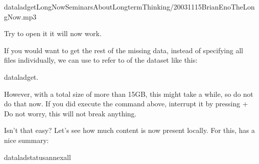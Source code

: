 \begin{sphinxVerbatim}[commandchars=\\\{\}]
dataladgetLong\PYGZus{}Now\PYGZus{}\PYGZus{}Seminars\PYGZus{}About\PYGZus{}Long\PYGZus{}term\PYGZus{}Thinking/2003\PYGZus{}11\PYGZus{}15\PYGZus{}\PYGZus{}Brian\PYGZus{}Eno\PYGZus{}\PYGZus{}The\PYGZus{}Long\PYGZus{}Now.mp3
\end{sphinxVerbatim}

\sphinxAtStartPar
Try to open it \textendash{} it will now work.

\sphinxAtStartPar
If you would want to get the rest of the missing data, instead of specifying all files individually,
we can use  to refer to  of the dataset like this:

\begin{sphinxVerbatim}[commandchars=\\\{\}]
dataladget.
\end{sphinxVerbatim}

\sphinxAtStartPar
However, with a total size of more than 15GB, this might take a while, so do not do that now.
If you did execute the command above, interrupt it by pressing  +  \textendash{} Do not worry,
this will not break anything.

\ignorespaces 
\sphinxAtStartPar
Isn’t that easy?
Let’s see how much content is now present locally. For this, 
has a nice summary:

\begin{sphinxVerbatim}[commandchars=\\\{\}]
dataladstatus\PYGZhy{}\PYGZhy{}annexall
\end{sphinxVerbatim}

